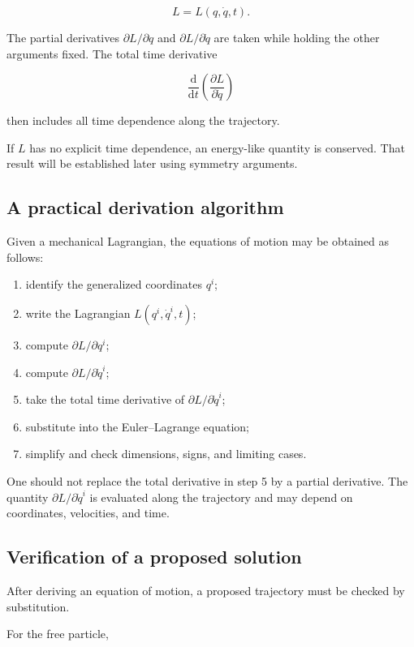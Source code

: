 \[
L=L(q,\dot q,t).
\]

The partial derivatives \(\partial L/\partial q\) and \(\partial L/\partial\dot q\) are taken while holding the other arguments fixed. The total time derivative

\[
\frac{\mathrm{d}}{\mathrm{d}t}
\left(
\frac{\partial L}{\partial\dot q}
\right)
\]

then includes all time dependence along the trajectory.

If \(L\) has no explicit time dependence, an energy-like quantity is conserved. That result will be established later using symmetry arguments.

\subsection{A practical derivation algorithm}

Given a mechanical Lagrangian, the equations of motion may be obtained as follows:

\begin{enumerate}
    \item identify the generalized coordinates \(q^{i}\);
    \item write the Lagrangian \(L(q^{i},\dot q^{i},t)\);
    \item compute \(\partial L/\partial q^{i}\);
    \item compute \(\partial L/\partial\dot q^{i}\);
    \item take the total time derivative of \(\partial L/\partial\dot q^{i}\);
    \item substitute into the Euler--Lagrange equation;
    \item simplify and check dimensions, signs, and limiting cases.
\end{enumerate}

One should not replace the total derivative in step 5 by a partial derivative. The quantity \(\partial L/\partial\dot q^{i}\) is evaluated along the trajectory and may depend on coordinates, velocities, and time.

\subsection{Verification of a proposed solution}

After deriving an equation of motion, a proposed trajectory must be checked by substitution.

For the free particle,

